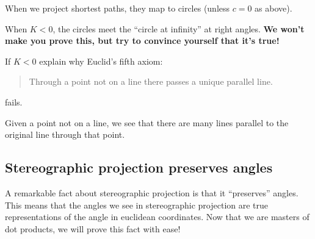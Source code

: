 \documentclass[newpage,hints,12pt,noauthor,nooutcomes]{ximera}
\begin{document}
When we project shortest paths, they map to circles (unless $c=0$ as above).

When $K<0$, the circles meet the ``circle at infinity'' at right angles.
\textbf{We won't make you prove this, but try to convince yourself that it's true!}

\begin{center}
\end{center}

\begin{problem}
  If $K<0$ explain why Euclid's fifth axiom:
  \begin{quote}
    Through a point not on a line there passes a unique parallel line.
  \end{quote}
  fails.
  \begin{freeResponse}
    Given a point not on a line, we see that there are many lines
    parallel to the original line through that point.
  \end{freeResponse}
\end{problem}







\subsection{Stereographic projection preserves angles}


A remarkable fact about stereographic projection is that it
``preserves'' angles. This means that the angles we see in
stereographic projection are true representations of the angle in
euclidean coordinates.  Now that we are masters of dot products, we
will prove this fact with ease!
\end{document}
